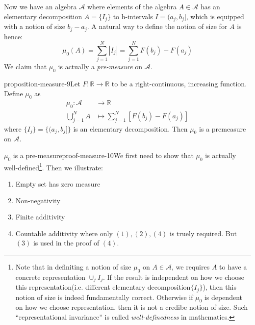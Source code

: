 Now we have an algebra $\mathcal A$ where elements of the algebra $A\in \mathcal A$ has an elementary decomposition $A=\{I_j\}$ to h-intervals $I=(a_j,b_j]$, which is equipped with a notion of size $b_j -a_j$. A natural way to define the notion of size for $A$ is hence:
\begin{equation}
\mu_0(A) = \sum_{j=1}^N |I_j| =\sum_{j=1}^N F(b_j)-F(a_j)
\end{equation}
We claim that $\mu_0$ is actually a \textit{pre-measure} on $\mathcal A$.

\begin{mystthmproposition}{}{proposition-measure-9}Let $F:\mathbb{R}\to\mathbb{R}$ to be a right-continuous, increasing function. Define $\mu_0$ as
\begin{equation}
\begin{aligned}
\mu_0 : \mathcal A &\to \mathbb{R} \\
\bigcup_{j=1}^N A &\mapsto \sum_{j=1}^N [F(b_j)-F(a_j)]
\end{aligned}
\end{equation}
where $\{I_j\}=\{(a_j,b_j]\}$ is an elementary decomposition. Then $\mu_0$ is a premeasure on $\mathcal A$.

\end{mystthmproposition}
\begin{mystthmproof}{$\mu_0$ is a pre-measure}{proof-measure-10}We first need to show that $\mu_0$ is actually well-defined\footnote{Note that in definiting a notion of size $\mu_0$ on $A\in \mathcal A$, we requires $A$ to have a concrete representation $\cup_j I_j$. If the result is independent on
how we choose this representation(i.e. different elementary decomposition$\{I_j\}$), then this notion of size is indeed fundamentally correct. Otherwise if $\mu_0$ is dependent on how we choose representation, then it is not a credibe notion of size. Such ``representational invariance'' is called \textit{well-definedness} in mathematics.}. Then we illustrate:

\begin{enumerate}
\item Empty set has zero measure
\item Non-negativity
\item Finite additivity
\item Countable additivity
where only $(1),(2),(4)$ is truely required. But $(3)$ is used in the proof of $(4)$.
\end{enumerate}

\end{mystthmproof}
